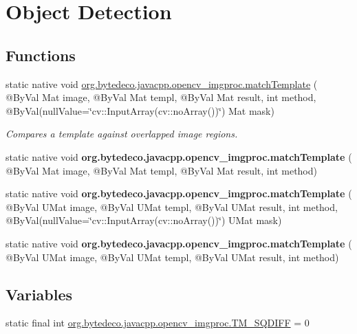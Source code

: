 \hypertarget{group__imgproc__object}{}\section{Object Detection}
\label{group__imgproc__object}
\subsection*{Functions}
\begin{DoxyCompactItemize}
\item 
static native void \hyperlink{group__imgproc__object_ga9a21de5c468f2b954413017382a99d29}{org.\+bytedeco.\+javacpp.\+opencv\+\_\+imgproc.\+match\+Template} ( @By\+Val Mat image, @By\+Val Mat templ, @By\+Val Mat result, int method, @By\+Val(null\+Value=\char`\"{}cv\+::\+Input\+Array(cv\+::no\+Array())\char`\"{}) Mat mask)
\begin{DoxyCompactList}\small\item\em Compares a template against overlapped image regions. \end{DoxyCompactList}\item 
\mbox{\label{group__imgproc__object_ga4bc3fb80e12e57e0e5944fd591af0aa5}} 
static native void {\bfseries org.\+bytedeco.\+javacpp.\+opencv\+\_\+imgproc.\+match\+Template} ( @By\+Val Mat image, @By\+Val Mat templ, @By\+Val Mat result, int method)
\item 
\mbox{\label{group__imgproc__object_ga1c8d8f514d826fae33747ed3a844bc2f}} 
static native void {\bfseries org.\+bytedeco.\+javacpp.\+opencv\+\_\+imgproc.\+match\+Template} ( @By\+Val U\+Mat image, @By\+Val U\+Mat templ, @By\+Val U\+Mat result, int method, @By\+Val(null\+Value=\char`\"{}cv\+::\+Input\+Array(cv\+::no\+Array())\char`\"{}) U\+Mat mask)
\item 
\mbox{\label{group__imgproc__object_ga5b405fcf037b3b4c4d08d3264adb7e4d}} 
static native void {\bfseries org.\+bytedeco.\+javacpp.\+opencv\+\_\+imgproc.\+match\+Template} ( @By\+Val U\+Mat image, @By\+Val U\+Mat templ, @By\+Val U\+Mat result, int method)
\end{DoxyCompactItemize}
\subsection*{Variables}
\begin{DoxyCompactItemize}
\item 
static final int \hyperlink{group__imgproc__object_ga715306af5ab35ada7a80b4af7b0eb0c3}{org.\+bytedeco.\+javacpp.\+opencv\+\_\+imgproc.\+T\+M\+\_\+\+S\+Q\+D\+I\+FF} = 0
\end{DoxyCompactItemize}


